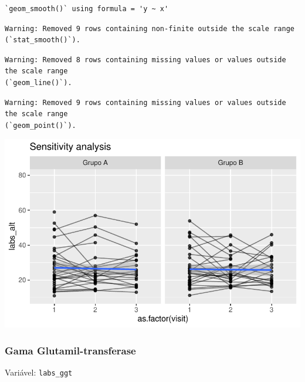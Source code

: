 \documentclass[
  letterpaper,
  DIV=11,
  numbers=noendperiod]{scrartcl}
\begin{document}
\begin{verbatim}
`geom_smooth()` using formula = 'y ~ x'
\end{verbatim}

\begin{verbatim}
Warning: Removed 9 rows containing non-finite outside the scale range
(`stat_smooth()`).
\end{verbatim}

\begin{verbatim}
Warning: Removed 8 rows containing missing values or values outside the scale range
(`geom_line()`).
\end{verbatim}

\begin{verbatim}
Warning: Removed 9 rows containing missing values or values outside the scale range
(`geom_point()`).
\end{verbatim}

\includegraphics{Outcomes_V1V2V3_files/figure-pdf/labs_alt_6-2.pdf}

\subsubsection{Gama
Glutamil-transferase}\label{gama-glutamil-transferase}

Variável: \texttt{labs\_ggt}
\end{document}
